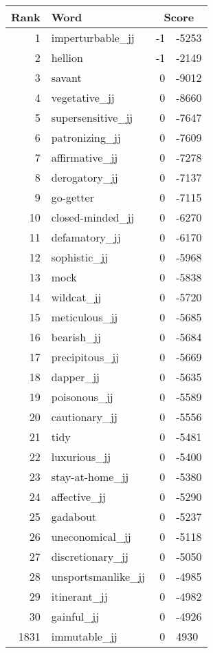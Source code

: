 \begin{longtable}[!htbp]{| rlr@{.}l |}
    \hline
    \textbf{Rank} & \textbf{Word} & \multicolumn{2}{c|}{\textbf{Score}} \\
    \hline
    \endhead
    1 & imperturbable\_jj & -1 & -5253 \\
    2 & hellion & -1 & -2149 \\
    3 & savant & 0 & -9012 \\
    4 & vegetative\_jj & 0 & -8660 \\
    5 & supersensitive\_jj & 0 & -7647 \\
    6 & patronizing\_jj & 0 & -7609 \\
    7 & affirmative\_jj & 0 & -7278 \\
    8 & derogatory\_jj & 0 & -7137 \\
    9 & go-getter & 0 & -7115 \\
    10 & closed-minded\_jj & 0 & -6270 \\
    11 & defamatory\_jj & 0 & -6170 \\
    12 & sophistic\_jj & 0 & -5968 \\
    13 & mock & 0 & -5838 \\
    14 & wildcat\_jj & 0 & -5720 \\
    15 & meticulous\_jj & 0 & -5685 \\
    16 & bearish\_jj & 0 & -5684 \\
    17 & precipitous\_jj & 0 & -5669 \\
    18 & dapper\_jj & 0 & -5635 \\
    19 & poisonous\_jj & 0 & -5589 \\
    20 & cautionary\_jj & 0 & -5556 \\
    21 & tidy & 0 & -5481 \\
    22 & luxurious\_jj & 0 & -5400 \\
    23 & stay-at-home\_jj & 0 & -5380 \\
    24 & affective\_jj & 0 & -5290 \\
    25 & gadabout & 0 & -5237 \\
    26 & uneconomical\_jj & 0 & -5118 \\
    27 & discretionary\_jj & 0 & -5050 \\
    28 & unsportsmanlike\_jj & 0 & -4985 \\
    29 & itinerant\_jj & 0 & -4982 \\
    30 & gainful\_jj & 0 & -4926 \\
    1831 & immutable\_jj & 0 & 4930 \\

\end{longtable}
